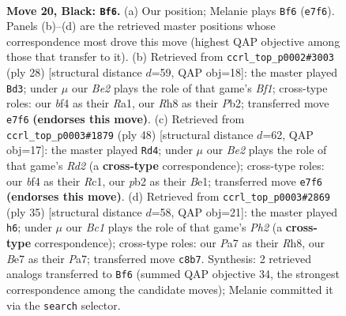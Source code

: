\documentclass[11pt]{article}
\begin{document}
\clearpage

\begin{figure}[p]\centering
\begin{subfigure}{0.46\textwidth}\centering
\resizebox{\linewidth}{!}{%
\newchessgame
\chessboard[
  setfen={r1b1k1nr/p3b1pp/2p5/5p2/2N2B2/3B1P1P/PPP3P1/R2R2K1 b - - 2 20},
  showmover=false,
  pgfstyle=straightmove, color=movearrow, markmove={e7-f6}
]}
\caption{}
\end{subfigure}\hfill
\begin{subfigure}{0.46\textwidth}\centering
\resizebox{\linewidth}{!}{%
\newchessgame
\chessboard[
  setfen={r1b1k2r/1p3pp1/p2b3p/3p4/6PP/4BP2/PPP5/R3KB1R w KQkq - 1 15},
  showmover=false,
  pgfstyle=straightmove, color=movearrow, markmove={f1-d3}
]}
\caption{}
\end{subfigure}
\\[4pt]
\begin{subfigure}{0.46\textwidth}\centering
\resizebox{\linewidth}{!}{%
\newchessgame
\chessboard[
  setfen={r5k1/1r2ppbp/p1b2np1/8/1P6/2N1PP2/3RB1PP/2R1B1K1 w - - 5 25},
  showmover=false,
  pgfstyle=straightmove, color=movearrow, markmove={d2-d4}
]}
\caption{}
\end{subfigure}\hfill
\begin{subfigure}{0.46\textwidth}\centering
\resizebox{\linewidth}{!}{%
\newchessgame
\chessboard[
  setfen={4k2r/pp2bppp/3rn3/2p1p3/4P3/4B1PP/PPP2PB1/R3R1K1 b k - 1 18},
  showmover=false,
  pgfstyle=straightmove, color=movearrow, markmove={h7-h6}
]}
\caption{}
\end{subfigure}
\caption{\textbf{Move 20, Black: \texttt{Bf6}.} (a) Our position; Melanie plays \texttt{Bf6} (\texttt{e7f6}). Panels (b)--(d) are the retrieved master positions whose correspondence most drove this move (highest QAP objective among those that transfer to it). (b) Retrieved from \texttt{ccrl\_top\_p0002\#3003} (ply 28) [structural distance $d$=59, QAP obj=18]: the master played \texttt{Bd3}; under $\mu$ our \emph{Be2} plays the role of that game's \emph{Bf1}; cross-type roles: our \emph{b}f4 as their \emph{R}a1, our \emph{R}h8 as their \emph{P}b2; transferred move \texttt{e7f6} \textbf{(endorses this move)}. (c) Retrieved from \texttt{ccrl\_top\_p0003\#1879} (ply 48) [structural distance $d$=62, QAP obj=17]: the master played \texttt{Rd4}; under $\mu$ our \emph{Be2} plays the role of that game's \emph{Rd2} (a \textbf{cross-type} correspondence); cross-type roles: our \emph{b}f4 as their \emph{R}c1, our \emph{p}b2 as their \emph{B}e1; transferred move \texttt{e7f6} \textbf{(endorses this move)}. (d) Retrieved from \texttt{ccrl\_top\_p0003\#2869} (ply 35) [structural distance $d$=58, QAP obj=21]: the master played \texttt{h6}; under $\mu$ our \emph{Bc1} plays the role of that game's \emph{Ph2} (a \textbf{cross-type} correspondence); cross-type roles: our \emph{P}a7 as their \emph{R}h8, our \emph{B}e7 as their \emph{P}a7; transferred move \texttt{c8b7}. Synthesis: 2 retrieved analogs transferred to \texttt{Bf6} (summed QAP objective 34, the strongest correspondence among the candidate moves); Melanie committed it via the \texttt{search} selector.}
\label{fig:thought-m39}
\end{figure}
\end{document}

